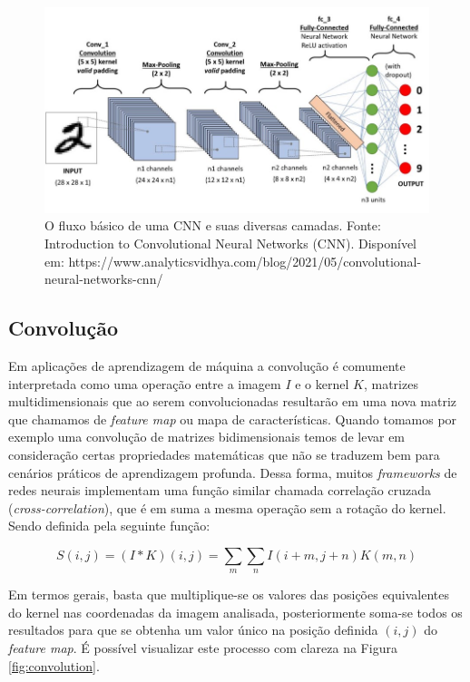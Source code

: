 \documentclass[12pt]{article}
\begin{document}
\begin{figure}[ht]
  \centering
  \includegraphics[width=1\textwidth]{images/CNN.jpeg}
  \caption{O fluxo básico de uma CNN e suas diversas camadas. Fonte: Introduction to Convolutional Neural Networks (CNN). Disponível em: https://www.analyticsvidhya.com/blog/2021/05/convolutional-neural-networks-cnn/}
  \label{fig:cnn}
\end{figure}



\subsection{Convolução}

Em aplicações de aprendizagem de máquina a convolução é comumente interpretada como uma operação entre a imagem $I$ e o kernel $K$, matrizes multidimensionais que ao serem convolucionadas resultarão em uma nova matriz que chamamos de {\it{feature map}} ou mapa de características. Quando tomamos por exemplo uma convolução de matrizes bidimensionais temos de levar em consideração certas propriedades matemáticas que não se traduzem bem para cenários práticos de aprendizagem profunda. Dessa forma, muitos {\it frameworks} de redes neurais implementam uma função similar chamada
correlação cruzada ({\it cross-correlation}), que é em suma a mesma operação sem a rotação do kernel. Sendo definida pela seguinte função:

$$ S(i,j) = (I * K) (i,j) = \sum_m \sum_n I(i + m, j + n) K(m, n)  $$


Em termos gerais, basta que multiplique-se os valores das posições equivalentes do kernel nas coordenadas da imagem analisada, posteriormente soma-se todos os resultados para que se obtenha um valor único na posição definida $(i,j)$ do {\it feature map}. É possível visualizar este processo com clareza na Figura \ref{fig:convolution}.
\end{document}
